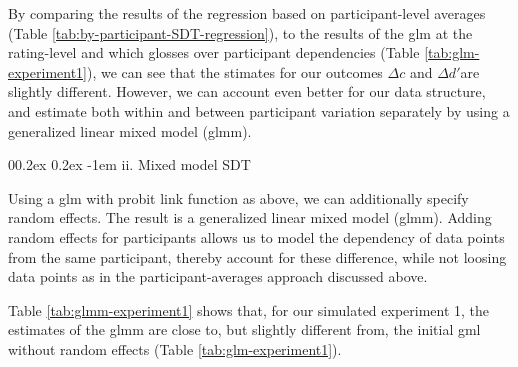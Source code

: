 \documentclass[
  man,mask,floatsintext]{apa6}
\makeatletter
\let\oldparagraph\paragraph
\renewcommand{\paragraph}{
    \@ifstar
      \xxxParagraphStar
      \xxxParagraphNoStar
  }
\newcommand{\xxxParagraphStar}[1]{\oldparagraph*{#1}\mbox{}}
\newcommand{\xxxParagraphNoStar}[1]{\oldparagraph{#1}\mbox{}}
\renewcommand{\paragraph}{\@startsection{paragraph}{4}{\parindent}%
  {0\baselineskip \@plus 0.2ex \@minus 0.2ex}%
  {-1em}%
  {\normalfont\normalsize\bfseries\itshape\typesectitle}}
\makeatother
\begin{document}
By comparing the results of the regression based on participant-level averages (Table \ref{tab:by-participant-SDT-regression}), to the results of the glm at the rating-level and which glosses over participant dependencies (Table \ref{tab:glm-experiment1}), we can see that the stimates for our outcomes \(\Delta c\) and \(\Delta d'\)are slightly different. However, we can account even better for our data structure, and estimate both within and between participant variation separately by using a generalized linear mixed model (glmm).

\paragraph{ii. Mixed model SDT}\label{ii.-mixed-model-sdt}

Using a glm with probit link function as above, we can additionally specify random effects. The result is a generalized linear mixed model (glmm). Adding random effects for participants allows us to model the dependency of data points from the same participant, thereby account for these difference, while not loosing data points as in the participant-averages approach discussed above.

Table \ref{tab:glmm-experiment1} shows that, for our simulated experiment 1, the estimates of the glmm are close to, but slightly different from, the initial gml without random effects (Table \ref{tab:glm-experiment1}).

\begin{table}
\centering
\caption{\label{tab:glmm-experiment1}Results of a generalize linear mixed model (glmm)}
\centering
{}
\end{table}
\end{document}
